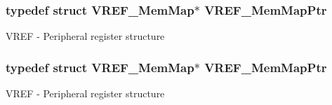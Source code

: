 \subsubsection[{\texorpdfstring{V\+R\+E\+F\+\_\+\+Mem\+Map\+Ptr}{VREF_MemMapPtr}}]{\setlength{\rightskip}{0pt plus 5cm}typedef struct {\bf V\+R\+E\+F\+\_\+\+Mem\+Map}$\ast$ {\bf V\+R\+E\+F\+\_\+\+Mem\+Map\+Ptr}}\hypertarget{group___v_r_e_f___peripheral_ga0730b01086e1d40975ad4e6c1d101b7c}{}\label{group___v_r_e_f___peripheral_ga0730b01086e1d40975ad4e6c1d101b7c}
V\+R\+EF -\/ Peripheral register structure 
\subsubsection[{\texorpdfstring{V\+R\+E\+F\+\_\+\+Mem\+Map\+Ptr}{VREF_MemMapPtr}}]{\setlength{\rightskip}{0pt plus 5cm}typedef struct {\bf V\+R\+E\+F\+\_\+\+Mem\+Map}$\ast$ {\bf V\+R\+E\+F\+\_\+\+Mem\+Map\+Ptr}}\hypertarget{group___v_r_e_f___peripheral_ga0730b01086e1d40975ad4e6c1d101b7c}{}\label{group___v_r_e_f___peripheral_ga0730b01086e1d40975ad4e6c1d101b7c}
V\+R\+EF -\/ Peripheral register structure 